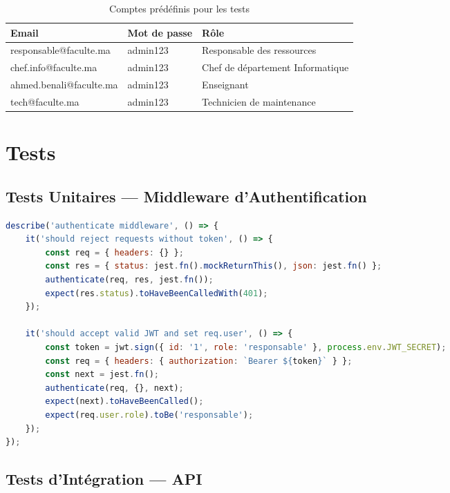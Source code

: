 \begin{table}[h!]
\centering
\begin{tabularx}{\textwidth}{|l|l|l|}
\hline
\textbf{Email} & \textbf{Mot de passe} & \textbf{Rôle} \\
\hline
responsable@faculte.ma & admin123 & Responsable des ressources \\
\hline
chef.info@faculte.ma & admin123 & Chef de département Informatique \\
\hline
ahmed.benali@faculte.ma & admin123 & Enseignant \\
\hline
tech@faculte.ma & admin123 & Technicien de maintenance \\
\hline
\end{tabularx}
\caption{Comptes prédéfinis pour les tests}
\end{table}

\section{Tests}

\subsection{Tests Unitaires — Middleware d'Authentification}

\begin{lstlisting}[language=JavaScript, caption={Tests JWT}]
describe('authenticate middleware', () => {
    it('should reject requests without token', () => {
        const req = { headers: {} };
        const res = { status: jest.fn().mockReturnThis(), json: jest.fn() };
        authenticate(req, res, jest.fn());
        expect(res.status).toHaveBeenCalledWith(401);
    });

    it('should accept valid JWT and set req.user', () => {
        const token = jwt.sign({ id: '1', role: 'responsable' }, process.env.JWT_SECRET);
        const req = { headers: { authorization: `Bearer ${token}` } };
        const next = jest.fn();
        authenticate(req, {}, next);
        expect(next).toHaveBeenCalled();
        expect(req.user.role).toBe('responsable');
    });
});
\end{lstlisting}

\subsection{Tests d'Intégration — API}

